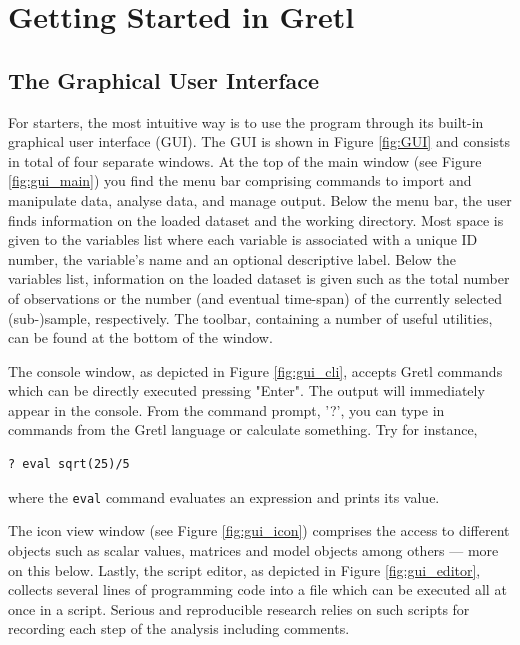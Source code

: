 \documentclass[11pt]{article}
\begin{document}
\section{Getting Started in Gretl}
\subsection{The Graphical User Interface}
For starters, the most intuitive way is to use the program through its built-in graphical user interface (GUI). The GUI is shown in Figure \ref{fig:GUI} and consists in total of four separate windows. At the top of the main window (see Figure \ref{fig:gui_main}) you find the menu bar comprising commands to import and manipulate data, analyse data, and manage output. Below the menu bar, the user finds information on the loaded dataset and the working directory. Most space is given to the variables list where each variable is associated with a unique ID number, the variable's name and an optional descriptive label. Below the variables list, information on the loaded dataset is given such as the total number of observations or the number (and eventual time-span) of the currently selected (sub-)sample, respectively. The toolbar, containing a number of useful utilities, can be found at the bottom of the window. 

The console window, as depicted in Figure \ref{fig:gui_cli}, accepts Gretl commands which can be directly executed pressing "Enter". The output will immediately appear in the console. From the command prompt, '?', you can type in commands from the Gretl language or calculate something. Try for instance,
\begin{verbatim}
? eval sqrt(25)/5
\end{verbatim}
where the \texttt{eval} command evaluates an expression and prints its value.

The icon view window (see Figure \ref{fig:gui_icon}) comprises the access to different objects such as scalar values, matrices and model objects among others --- more on this below. Lastly, the script editor, as depicted in Figure \ref{fig:gui_editor}, collects several lines of programming code into a file which can be executed all at once in a script. Serious and reproducible research relies on such scripts for recording each step of the analysis including comments.
\end{document}
